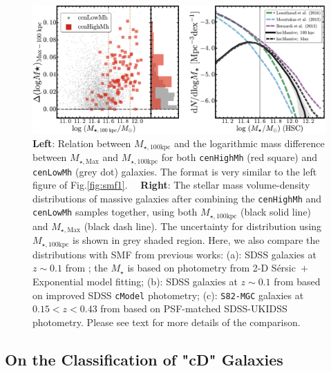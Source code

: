 \documentclass{emulateapj}
\def\ser{{S\'{e}rsic\ }}
\def\rbcg{\texttt{cenHighMh}}
\def\nbcg{\texttt{cenLowMh}}
\def\mstar{{$M_{\star}$}}
\def\mtot{{$M_{\star,100\mathrm{kpc}}$}}
\def\mmax{{$M_{\star,\mathrm{Max}}$}}
\newcommand{\update}[1]{\textcolor{Bittersweet}{#1}}
\begin{document}
\begin{CJK*}{UTF8}{gbsn}
  \begin{figure}[t]
      \centering 
      \includegraphics[width=\textwidth]{fig/redbcg_discussion_5}
      \caption{
      \update{
          \textbf{Left}: Relation between \mtot{} and the logarithmic mass difference 
          between \mmax{} and \mtot{} for both \rbcg{} (red square) and \nbcg{} 
          (grey dot) galaxies.  The format is very similar to the left figure of 
          Fig.\ref{fig:smf1}.~~
          \textbf{Right}: The stellar mass volume-density distributions of massive galaxies 
          after combining the \rbcg{} and \nbcg{} samples together, using both 
          \mtot{} (black solid line) and \mmax{} (black dash line). 
          The uncertainty for distribution using \mtot{} is shown in grey shaded region.  
          Here, we also compare the distributions with SMF from previous works: 
          (a): SDSS galaxies at $z\sim 0.1$ from \citet{Bernardi2013}; the \mstar{} is 
          based on photometry from 2-D \ser{}$+$Exponential model fitting; 
          (b): SDSS galaxies at $z\sim 0.1$ from \citet{Moustakas13} based on 
          improved SDSS \texttt{cModel} photometry; 
          (c): \texttt{S82-MGC} galaxies at $0.15 < z< 0.43$ from 
          \citet{Leauthaud2016} based on PSF-matched SDSS-UKIDSS photometry.
          Please see text for more details of the comparison.
          }}
      \label{fig:discussion_2}
  \end{figure}

    
\subsection{On the Classification of "cD" Galaxies}


\end{CJK*}
\end{document}
